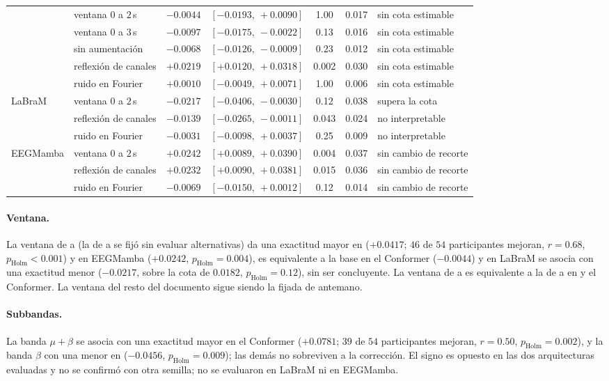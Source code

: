 \begin{table}[H]
{\begin{tabular}{llccccl}
 & ventana $0$ a $2$\,s & $-0.0044$ & $[-0.0193,\ +0.0090]$ & 1.00 & 0.017 & sin cota estimable \\
 & ventana $0$ a $3$\,s & $-0.0097$ & $[-0.0175,\ -0.0022]$ & 0.13 & 0.016 & sin cota estimable \\
 & sin aumentación & $-0.0068$ & $[-0.0126,\ -0.0009]$ & 0.23 & 0.012 & sin cota estimable \\
 & reflexión de canales & $+0.0219$ & $[+0.0120,\ +0.0318]$ & 0.002 & 0.030 & sin cota estimable \\
 & ruido en Fourier & $+0.0010$ & $[-0.0049,\ +0.0071]$ & 1.00 & 0.006 & sin cota estimable \\
\midrule
LaBraM & ventana $0$ a $2$\,s & $-0.0217$ & $[-0.0406,\ -0.0030]$ & 0.12 & 0.038 & supera la cota \\
 & reflexión de canales & $-0.0139$ & $[-0.0265,\ -0.0011]$ & 0.043 & 0.024 & no interpretable \\
 & ruido en Fourier & $-0.0031$ & $[-0.0098,\ +0.0037]$ & 0.25 & 0.009 & no interpretable \\
\midrule
EEGMamba & ventana $0$ a $2$\,s & $+0.0242$ & $[+0.0089,\ +0.0390]$ & 0.004 & 0.037 & sin cambio de recorte \\
 & reflexión de canales & $+0.0232$ & $[+0.0090,\ +0.0381]$ & 0.015 & 0.036 & sin cambio de recorte \\
 & ruido en Fourier & $-0.0069$ & $[-0.0150,\ +0.0012]$ & 0.12 & 0.014 & sin cambio de recorte \\
\bottomrule
\end{tabular}
}
\end{table}

\paragraph{Ventana.} La ventana de  a  (la de  a  se fijó sin evaluar
alternativas) da una exactitud mayor en \eegnet{} ($+0.0417$; $46$ de $54$ participantes mejoran,
$r = 0.68$, $p_{\text{Holm}} < 0.001$) y en EEGMamba ($+0.0242$, $p_{\text{Holm}} = 0.004$), es
equivalente a la base en el Conformer ($-0.0044$) y en LaBraM se asocia con una exactitud menor
($-0.0217$, sobre la cota de $0.0182$, $p_{\text{Holm}} = 0.12$), sin ser concluyente. La ventana de
 a  es equivalente a la de  a  en \eegnet{} y el Conformer. La ventana del
resto del documento sigue siendo la fijada de antemano.

\paragraph{Subbandas.} La banda $\mu+\beta$ se asocia con una exactitud mayor en el Conformer
($+0.0781$; $39$ de $54$ participantes mejoran, $r = 0.50$, $p_{\text{Holm}} = 0.002$), y la banda $\beta$
con una menor en \eegnet{} ($-0.0456$, $p_{\text{Holm}} = 0.009$); las demás no sobreviven a la
corrección. El signo es opuesto en las dos arquitecturas evaluadas y no se confirmó con otra semilla; no se
evaluaron en LaBraM ni en EEGMamba.

